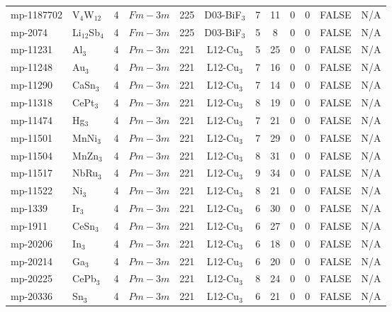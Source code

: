 {\begin{longtable}{llcccccccccc}
    mp-1187702 & V$_{4}$W$_{12}$ & 4     & $Fm-3m$ & 225   & D03-BiF$_{3}$ & 7     & 11    & 0     & 0     & FALSE & N/A \\
    mp-2074 & Li$_{12}$Sb$_{4}$ & 4     & $Fm-3m$ & 225   & D03-BiF$_{3}$ & 5     & 8     & 0     & 0     & FALSE & N/A \\
    mp-11231 & Al$_{3}$ & 4     & $Pm-3m$ & 221   & L12-Cu$_{3}$ & 5     & 25    & 0     & 0     & FALSE & N/A \\
    mp-11248 & Au$_{3}$ & 4     & $Pm-3m$ & 221   & L12-Cu$_{3}$ & 7     & 16    & 0     & 0     & FALSE & N/A \\
    mp-11290 & CaSn$_{3}$ & 4     & $Pm-3m$ & 221   & L12-Cu$_{3}$ & 7     & 14    & 0     & 0     & FALSE & N/A \\
    mp-11318 & CePt$_{3}$ & 4     & $Pm-3m$ & 221   & L12-Cu$_{3}$ & 8     & 19    & 0     & 0     & FALSE & N/A \\
    mp-11474 & Hg$_{3}$ & 4     & $Pm-3m$ & 221   & L12-Cu$_{3}$ & 7     & 21    & 0     & 0     & FALSE & N/A \\
    mp-11501 & MnNi$_{3}$ & 4     & $Pm-3m$ & 221   & L12-Cu$_{3}$ & 7     & 29    & 0     & 0     & FALSE & N/A \\
    mp-11504 & MnZn$_{3}$ & 4     & $Pm-3m$ & 221   & L12-Cu$_{3}$ & 8     & 31    & 0     & 0     & FALSE & N/A \\
    mp-11517 & NbRu$_{3}$ & 4     & $Pm-3m$ & 221   & L12-Cu$_{3}$ & 9     & 34    & 0     & 0     & FALSE & N/A \\
    mp-11522 & Ni$_{3}$ & 4     & $Pm-3m$ & 221   & L12-Cu$_{3}$ & 8     & 21    & 0     & 0     & FALSE & N/A \\
    mp-1339 & Ir$_{3}$ & 4     & $Pm-3m$ & 221   & L12-Cu$_{3}$ & 6     & 30    & 0     & 0     & FALSE & N/A \\
    mp-1911 & CeSn$_{3}$ & 4     & $Pm-3m$ & 221   & L12-Cu$_{3}$ & 6     & 27    & 0     & 0     & FALSE & N/A \\
    mp-20206 & In$_{3}$ & 4     & $Pm-3m$ & 221   & L12-Cu$_{3}$ & 6     & 18    & 0     & 0     & FALSE & N/A \\
    mp-20214 & Ga$_{3}$ & 4     & $Pm-3m$ & 221   & L12-Cu$_{3}$ & 6     & 20    & 0     & 0     & FALSE & N/A \\
    mp-20225 & CePb$_{3}$ & 4     & $Pm-3m$ & 221   & L12-Cu$_{3}$ & 8     & 24    & 0     & 0     & FALSE & N/A \\
    mp-20336 & Sn$_{3}$ & 4     & $Pm-3m$ & 221   & L12-Cu$_{3}$ & 6     & 21    & 0     & 0     & FALSE & N/A \\

\end{longtable}}
